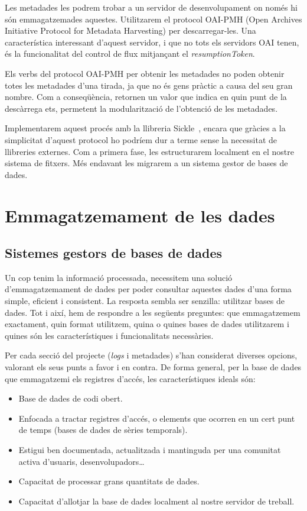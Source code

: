 \documentclass[lettersize,journal]{IEEEtran}
\begin{document}
Les metadades les podrem trobar a un servidor de desenvolupament on només hi són emmagatzemades aquestes.
Utilitzarem el protocol OAI-PMH (Open Archives Initiative Protocol for Metadata Harvesting) per descarregar-les.
Una característica interessant d'aquest servidor, i que no tots els servidors OAI tenen, és la funcionalitat del control de flux mitjançant el \textit{resumptionToken}.

Els verbs del protocol OAI-PMH per obtenir les metadades no poden obtenir totes les metadades d'una tirada, ja que no és gens pràctic a causa del seu gran nombre.
Com a conseqüència, retornen un valor que indica en quin punt de la descàrrega ets, permetent la modularització de l'obtenció de les metadades.

Implementarem aquest procés amb la llibreria Sickle~\cite{Sickle}, encara que gràcies a la simplicitat d'aquest protocol ho podríem dur a terme sense la necessitat de llibreries externes.
Com a primera fase, les estructurarem localment en el nostre sistema de fitxers.
Més endavant les migrarem a un sistema gestor de bases de dades.


\section{Emmagatzemament de les dades}\label{sec:data-storing}
\subsection{Sistemes gestors de bases de dades}\label{subsec:data-storing-requirements}
Un cop tenim la informació processada, necessitem una solució d'emmagatzemament de dades per poder consultar aquestes dades d'una forma simple, eficient i consistent.
La resposta sembla ser senzilla: utilitzar bases de dades.
Tot i així, hem de respondre a les següents preguntes: que emmagatzemem exactament, quin format utilitzem, quina o quines bases de dades utilitzarem i quines són les característiques i funcionalitats necessàries.

Per cada secció del projecte (\textit{logs} i metadades) s'han considerat diverses opcions, valorant els seus punts a favor i en contra.
De forma general, per la base de dades que emmagatzemi els registres d'accés, les característiques ideals són:
\begin{itemize}
    \item Base de dades de codi obert.
    \item Enfocada a tractar registres d'accés, o elements que ocorren en un cert punt de temps (bases de dades de sèries temporals).
    \item Estigui ben documentada, actualitzada i mantinguda per una comunitat activa d'usuaris, desenvolupadors\dots
    \item Capacitat de processar grans quantitats de dades.
    \item Capacitat d'allotjar la base de dades localment al nostre servidor de treball.
\end{itemize}
\end{document}
